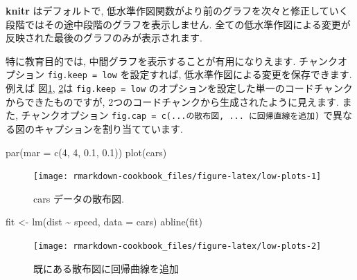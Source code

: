 \documentclass[
  11pt,
  lualatex,ja=standard,jafont=noto]{bxjsreport}
\newenvironment{Shaded}{\begin{snugshade}}{\end{snugshade}}
\newcommand{\AttributeTok}[1]{\textcolor[rgb]{0.77,0.63,0.00}{#1}}
\newcommand{\DecValTok}[1]{\textcolor[rgb]{0.00,0.00,0.81}{#1}}
\newcommand{\FloatTok}[1]{\textcolor[rgb]{0.00,0.00,0.81}{#1}}
\newcommand{\FunctionTok}[1]{\textcolor[rgb]{0.00,0.00,0.00}{#1}}
\newcommand{\NormalTok}[1]{#1}
\newcommand{\OtherTok}[1]{\textcolor[rgb]{0.56,0.35,0.01}{#1}}
\newcommand{\SpecialCharTok}[1]{\textcolor[rgb]{0.00,0.00,0.00}{#1}}
\begin{document}
\textbf{knitr} はデフォルトで, 低水準作図関数がより前のグラフを次々と修正していく段階ではその途中段階のグラフを表示しません. 全ての低水準作図による変更が反映された最後のグラフのみが表示されます.

特に教育目的では, 中間グラフを表示することが有用になりえます. チャンクオプション \texttt{fig.keep = \textquotesingle{}low\textquotesingle{}} を設定すれば, 低水準作図による変更を保存できます. 例えば 図\ref{fig:low-plots-1}, \ref{fig:low-plots-2}は \texttt{fig.keep = \textquotesingle{}low\textquotesingle{}} のオプションを設定した単一のコードチャンクからできたものですが, 2つのコードチャンクから生成されたように見えます. また, チャンクオプション \texttt{fig.cap = c(\textquotesingle{}...の散布図\textquotesingle{},\ \textquotesingle{}...\ に回帰直線を追加\textquotesingle{})}  で異なる図のキャプションを割り当てています.

\begin{Shaded}
\begin{Highlighting}[numbers=left,,]
\FunctionTok{par}\NormalTok{(}\AttributeTok{mar =} \FunctionTok{c}\NormalTok{(}\DecValTok{4}\NormalTok{, }\DecValTok{4}\NormalTok{, }\FloatTok{0.1}\NormalTok{, }\FloatTok{0.1}\NormalTok{))}
\FunctionTok{plot}\NormalTok{(cars)}
\end{Highlighting}
\end{Shaded}

\begin{figure}

{\centering \texttt{[image: rmarkdown-cookbook\_files/figure-latex/low-plots-1]} 

}

\caption{cars データの散布図.}\label{fig:low-plots-1}
\end{figure}

\begin{Shaded}
\begin{Highlighting}[numbers=left,,]
\NormalTok{fit }\OtherTok{\textless{}{-}} \FunctionTok{lm}\NormalTok{(dist }\SpecialCharTok{\textasciitilde{}}\NormalTok{ speed, }\AttributeTok{data =}\NormalTok{ cars)}
\FunctionTok{abline}\NormalTok{(fit)}
\end{Highlighting}
\end{Shaded}

\begin{figure}

{\centering \texttt{[image: rmarkdown-cookbook\_files/figure-latex/low-plots-2]} 

}

\caption{既にある散布図に回帰曲線を追加}\label{fig:low-plots-2}
\end{figure}
\end{document}
